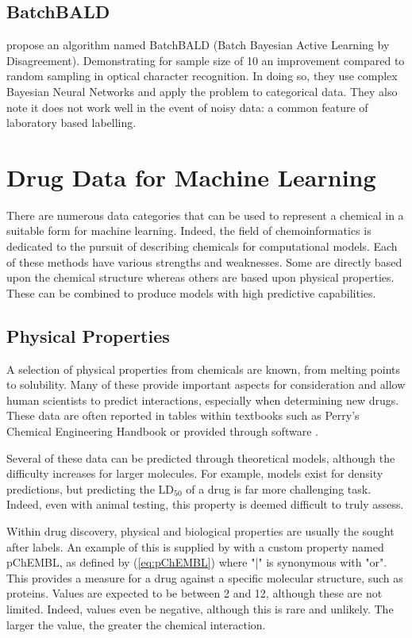 \subsection{BatchBALD}
\textcite{BatchBALD} propose an algorithm named BatchBALD (Batch Bayesian Active Learning by Disagreement). Demonstrating for sample size of 10 an improvement compared to random sampling in optical character recognition. In doing so, they use complex Bayesian Neural Networks and apply the problem to categorical data. They also note it does not work well in the event of noisy data: a common feature of laboratory based labelling.

\section{Drug Data for Machine Learning}
There are numerous data categories that can be used to represent a chemical in a suitable form for machine learning. Indeed, the field of chemoinformatics is dedicated to the pursuit of describing chemicals for computational models. Each of these methods have various strengths and weaknesses. Some are directly based upon the chemical structure whereas others are based upon physical properties. These can be combined to produce models with high predictive capabilities.

\subsection{Physical Properties}
A selection of physical properties from chemicals are known, from melting points to solubility. Many of these provide important aspects for consideration and allow human scientists to predict interactions, especially when determining new drugs. These data are often reported in tables within textbooks such as Perry's Chemical Engineering Handbook or provided through software \cite{CHEMBL,Perrys}.

Several of these data can be predicted through theoretical models, although the difficulty increases for larger molecules. For example, models exist for density predictions, but predicting the $\mathrm{LD_{50}}$ of a drug is  far more challenging task. Indeed, even with animal testing, this property is deemed difficult to truly assess.

Within drug discovery, physical and biological properties are usually the sought after labels. An example of this is supplied by \textcite{CHEMBL} with a custom property named pChEMBL, as defined by (\ref{eq:pChEMBL}) where "|" is synonymous with "or". This provides a measure for a drug against a specific molecular structure, such as proteins. Values are expected to be between 2 and 12, although these are not limited. Indeed, values even be negative, although this is rare and unlikely. The larger the value, the greater the chemical interaction.

